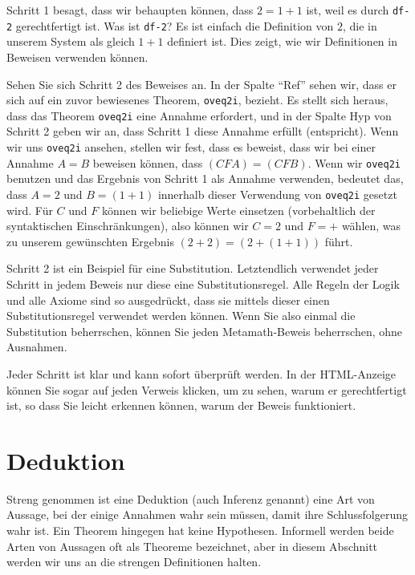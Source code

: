 Schritt 1 besagt, dass wir behaupten können, dass $2 = 1 + 1$ ist, weil es durch \texttt{df-2} gerechtfertigt ist. Was ist \texttt{df-2}? Es ist einfach die Definition von $2$, die in unserem System als gleich $1 + 1$ definiert ist.  Dies zeigt, wie wir Definitionen in Beweisen verwenden können.

Sehen Sie sich Schritt 2 des Beweises an. In der Spalte "`Ref"' sehen wir, dass er sich auf ein zuvor bewiesenes Theorem, \texttt{oveq2i}, bezieht. Es stellt sich heraus, dass das Theorem \texttt{oveq2i} eine Annahme erfordert, und in der Spalte Hyp von Schritt 2 geben wir an, dass Schritt 1 diese Annahme erfüllt (entspricht). Wenn wir uns \texttt{oveq2i} ansehen, stellen wir fest, dass es beweist, dass wir bei einer Annahme $A = B$ beweisen können, dass $( C F A ) = ( C F B )$. Wenn wir \texttt{oveq2i} benutzen und das Ergebnis von Schritt 1 als Annahme verwenden, bedeutet das, dass $A = 2$ und $B = ( 1 + 1 )$ innerhalb dieser Verwendung von \texttt{oveq2i} gesetzt wird. Für $C$ und $F$ können wir beliebige Werte einsetzen (vorbehaltlich der syntaktischen Einschränkungen), also können wir $C = 2$ und $F = +$ wählen, was zu unserem gewünschten Ergebnis $ (2 + 2) = (2 + (1 + 1))$ führt.

Schritt 2 ist ein Beispiel für eine Substitution. Letztendlich verwendet jeder Schritt in jedem Beweis nur diese eine Substitutionsregel. Alle Regeln der Logik und alle Axiome sind so ausgedrückt, dass sie mittels dieser einen Substitutionsregel verwendet werden können. Wenn Sie also einmal die Substitution beherrschen, können Sie jeden Metamath-Beweis beherrschen, ohne Ausnahmen.

Jeder Schritt ist klar und kann sofort überprüft werden. In der {\sc HTML}-Anzeige können Sie sogar auf jeden Verweis klicken, um zu sehen, warum er gerechtfertigt ist, so dass Sie leicht erkennen können, warum der Beweis funktioniert.

\section{Deduktion}\label{deduction}

Streng genommen ist eine Deduktion (auch Inferenz genannt) eine Art von Aussage, bei der einige Annahmen wahr sein müssen, damit ihre Schlussfolgerung wahr ist. Ein Theorem hingegen hat keine Hypothesen. Informell werden beide Arten von Aussagen oft als Theoreme bezeichnet, aber in diesem Abschnitt werden wir uns an die strengen Definitionen halten.


